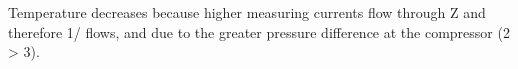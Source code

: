 Temperature decreases because higher measuring currents flow through Z and therefore 1/ flows, and due to the greater pressure difference at the compressor (2 > 3).